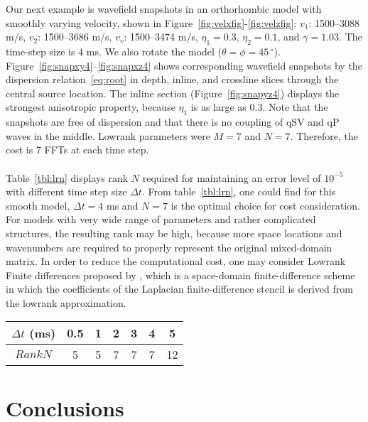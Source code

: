 Our next example is wavefield snapshots in an orthorhombic model with smoothly varying velocity, shown in Figure~\ref{fig:velxfig}-\ref{fig:velzfig}: 
$v_1$: 1500--3088 m/s, $v_2$: 1500--3686 m/s, $v_v$: 1500--3474 m/s, $\eta_1=0.3$, $\eta_2=0.1$, and $\gamma=1.03$.
The time-step size is 4 ms.
We also rotate the model ($\theta=\phi=45\,^{\circ}$).
Figure~\ref{fig:snapxy4}--\ref{fig:snapxz4} shows corresponding wavefield snapshots by the dispersion relation~\ref{eq:root} in depth, inline, and crossline slices through the central source location.
The inline section (Figure~\ref{fig:snapyz4}) displays the strongest anisotropic property, because $\eta_1$ is as large as $0.3$.
Note that the snapshots are free of dispersion and 
that there is no coupling of qSV and qP waves in the middle.
Lowrank parameters were $M=7$ and $N=7$.
Therefore, the cost is 7 FFTs at each time step.\\
\\
Table~\ref{tbl:lrn} displays rank $N$ required for maintaining an error level of $10^{-5}$
with different time step size $\Delta t$.
From table~\ref{tbl:lrn}, one could find for this smooth model, 
$\Delta t=4$ ms and $N=7$ is the optimal choice for cost consideration.
For models with very wide range of parameters and 
rather complicated structures, 
the resulting rank may be high, 
because more space locations and wavenumbers are required to properly represent the original mixed-domain matrix. 
In order to reduce the computational cost,
one may consider Lowrank Finite differences proposed by \cite{songxl}, 
which is a space-domain finite-difference scheme in which the coefficients of the Laplacian finite-difference stencil is derived from the lowrank approximation.
{
    \begin{center}
     \begin{tabular}{c|c|c|c|c|c|c}
      \hline
      \hline
      $\Delta t$ (ms) & 0.5 & 1 & 2 & 3 & 4 & 5 \\
      \hline
      $Rank N$             & 5   & 5 & 7 & 7 & 7 & 12 \\
      \hline
      \hline
     \end{tabular}
    \end{center}
}




\section{Conclusions}

